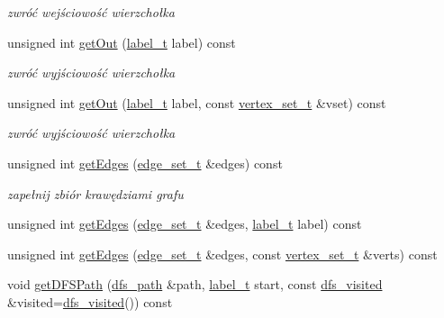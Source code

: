 \begin{DoxyCompactItemize}
\begin{DoxyCompactList}\small\item\em zwróć wejściowość wierzchołka \end{DoxyCompactList}\item 
unsigned int \hyperlink{classGraph_a136b8e5410d1f68c808f76cb1859026d}{get\-Out} (\hyperlink{classGraph_a2237a0ada8484c37b8200c0e3685ca71}{label\-\_\-t} label) const 
\begin{DoxyCompactList}\small\item\em zwróć wyjściowość wierzchołka \end{DoxyCompactList}\item 
unsigned int \hyperlink{classGraph_a39e23b858256af1a9ce21b74bffb62f4}{get\-Out} (\hyperlink{classGraph_a2237a0ada8484c37b8200c0e3685ca71}{label\-\_\-t} label, const \hyperlink{classGraph_ac91822a10fe3fc10ea8449531fc32b95}{vertex\-\_\-set\-\_\-t} \&vset) const 
\begin{DoxyCompactList}\small\item\em zwróć wyjściowość wierzchołka \end{DoxyCompactList}\item 
unsigned int \hyperlink{classGraph_a108b1de9af3e6cd422ded99e80a18664}{get\-Edges} (\hyperlink{classGraph_a7875f5959501bdafb3ba4dd428dfb10b}{edge\-\_\-set\-\_\-t} \&edges) const 
\begin{DoxyCompactList}\small\item\em zapełnij zbiór krawędziami grafu \end{DoxyCompactList}\item 
unsigned int \hyperlink{classGraph_aa9fc3b29889013a4a2d271357715904d}{get\-Edges} (\hyperlink{classGraph_a7875f5959501bdafb3ba4dd428dfb10b}{edge\-\_\-set\-\_\-t} \&edges, \hyperlink{classGraph_a2237a0ada8484c37b8200c0e3685ca71}{label\-\_\-t} label) const 
\item 
unsigned int \hyperlink{classGraph_a57425d2dd30d5f9ba267654deadda35a}{get\-Edges} (\hyperlink{classGraph_a7875f5959501bdafb3ba4dd428dfb10b}{edge\-\_\-set\-\_\-t} \&edges, const \hyperlink{classGraph_ac91822a10fe3fc10ea8449531fc32b95}{vertex\-\_\-set\-\_\-t} \&verts) const 
\item 
void \hyperlink{classGraph_a23c276cd34e6b1103a533e9cf6419877}{get\-D\-F\-S\-Path} (\hyperlink{classGraph_a8d2f79e14998a438e64bf07f31abb359}{dfs\-\_\-path} \&path, \hyperlink{classGraph_a2237a0ada8484c37b8200c0e3685ca71}{label\-\_\-t} start, const \hyperlink{classGraph_af10e18e1cb3834650bd69bad6bec3fc0}{dfs\-\_\-visited} \&visited=\hyperlink{classGraph_af10e18e1cb3834650bd69bad6bec3fc0}{dfs\-\_\-visited}()) const 

\end{DoxyCompactItemize}
